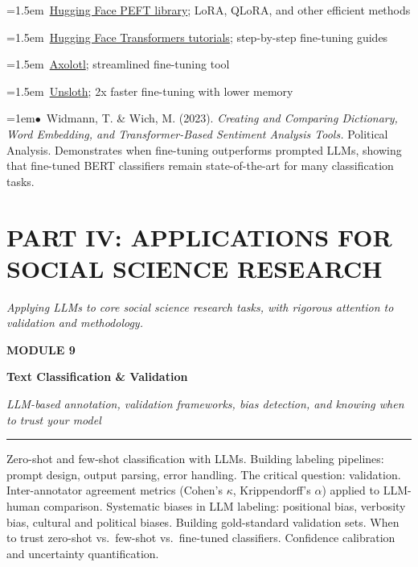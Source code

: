 \documentclass[11pt, a4paper]{article}
\newcommand{\modulehead}[3]{%
  \vspace{0.5em}
  {\small\sffamily\bfseries\textcolor{accent}{MODULE #1}}\par\vspace{-0.3em}
  {\Large\sffamily\bfseries\textcolor{dark}{#2}}\par\vspace{-0.2em}
  {\small\textit{\textcolor{muted}{#3}}}\par
  \vspace{0.2em}\textcolor{bordercol}{\rule{\textwidth}{0.3pt}}\par
}
\newcommand{\seclabel}[1]{%
  \vspace{0.6em}{\normalsize\sffamily\bfseries\textcolor{accent}{#1}}\par\vspace{0.2em}
}
\newcommand{\refpaper}[1]{%
  \par\hangindent=1em\hangafter=1\noindent\textcolor{accent}{\small$\bullet$}~{\small #1}\par
}
\newcommand{\resource}[1]{%
  \par\hangindent=1.5em\hangafter=1\noindent\hspace{0.5em}{\small\textcolor{accent}{\guilsinglright}}~{\small #1}\par
}
\begin{document}
\resource{\href{https://github.com/huggingface/peft}{Hugging Face PEFT library}; LoRA, QLoRA, and other efficient methods}

\resource{\href{https://huggingface.co/docs/transformers}{Hugging Face Transformers tutorials}; step-by-step fine-tuning guides}

\resource{\href{https://github.com/OpenAccess-AI-Collective/axolotl}{Axolotl}; streamlined fine-tuning tool}

\resource{\href{https://github.com/unslothai/unsloth}{Unsloth}; 2x faster fine-tuning with lower memory}

\seclabel{Social Science Applications}

\refpaper{Widmann, T. \& Wich, M. (2023). \textit{Creating and Comparing Dictionary, Word Embedding, and Transformer-Based Sentiment Analysis Tools.} Political Analysis. Demonstrates when fine-tuning outperforms prompted LLMs, showing that fine-tuned BERT classifiers remain state-of-the-art for many classification tasks.}

\newpage
\section{PART IV: APPLICATIONS FOR SOCIAL SCIENCE RESEARCH}
{\textit{\textcolor{muted}{Applying LLMs to core social science research tasks, with rigorous attention to validation and methodology.}}}

\vspace{1em}

\modulehead{9}{Text Classification \& Validation}{LLM-based annotation, validation frameworks, bias detection, and knowing when to trust your model}

\seclabel{Core Concepts}

Zero-shot and few-shot classification with LLMs. Building labeling pipelines: prompt design, output parsing, error handling. The critical question: validation. Inter-annotator agreement metrics (Cohen's $\kappa$, Krippendorff's $\alpha$) applied to LLM-human comparison. Systematic biases in LLM labeling: positional bias, verbosity bias, cultural and political biases. Building gold-standard validation sets. When to trust zero-shot vs.\ few-shot vs.\ fine-tuned classifiers. Confidence calibration and uncertainty quantification.

\seclabel{Core Readings}
\end{document}
